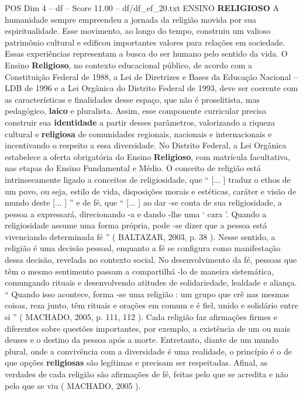 \begin{textsample}{POS Dim 4 – df – Score 11.00 – df/df\_ef\_20.txt}  \label{ex:f4_pos_223}
ENSINO \textbf{RELIGIOSO} A humanidade sempre empreendeu a jornada da religião movida por sua espiritualidade.
Esse movimento, ao longo do tempo, construiu um valioso patrimônio cultural e edificou importantes valores para relações em sociedade.
Essas experiências representam a busca do ser humano pelo sentido da vida.
O Ensino \textbf{Religioso}, no contexto educacional público, de acordo com a Constituição Federal de 1988, a Lei de Diretrizes e Bases da Educação Nacional – LDB de 1996 e a Lei Orgânica do Distrito Federal de 1993, deve ser coerente com as características e finalidades desse espaço, que não é proselitista, mas pedagógico, \textbf{laico} e pluralista.
Assim, esse componente curricular precisa construir sua \textbf{identidade} a partir desses parâmetros, valorizando a riqueza cultural e \textbf{religiosa} de comunidades regionais, nacionais e internacionais e incentivando o respeito a essa diversidade.
No Distrito Federal, a Lei Orgânica estabelece a oferta obrigatória do Ensino \textbf{Religioso}, com matrícula facultativa, nas etapas do Ensino Fundamental e Médio.
O conceito de religião está intrinsecamente ligado a conceitos de religiosidade, que “ [... ] traduz o ethos de um povo, ou seja, estilo de vida, disposições morais e estéticas, caráter e visão de mundo deste [... ] ” e de fé, que “ [... ] ao dar -se conta de sua religiosidade, a pessoa a expressará, direcionando -a e dando -lhe uma ‘ cara ’.
Quando a religiosidade assume uma forma própria, pode -se dizer que a pessoa está vivenciando determinada fé ” ( BALTAZAR, 2003, p. 38 ).
Nesse sentido, a religião é uma decisão pessoal, enquanto a fé se configura como manifestação dessa decisão, revelada no contexto social.
No desenvolvimento da fé, pessoas que têm o mesmo sentimento passam a compartilhá -lo de maneira sistemática, comungando rituais e desenvolvendo atitudes de solidariedade, lealdade e aliança. “ Quando isso acontece, forma -se uma religião : um grupo que crê nas mesmas coisas, reza junto, têm rituais e orações em comum e é fiel, unido e solidário entre si ” ( MACHADO, 2005, p. 111, 112 ).
Cada religião faz afirmações firmes e diferentes sobre questões importantes, por exemplo, a existência de um ou mais deuses e o destino da pessoa após a morte.
Entretanto, diante de um mundo plural, onde a convivência com a diversidade é uma realidade, o princípio é o de que opções \textbf{religiosas} são legítimas e precisam ser respeitadas.
Afinal, as verdades de cada religião são afirmações de fé, feitas pelo que se acredita e não pelo que se viu ( MACHADO, 2005 ).

\end{textsample}
